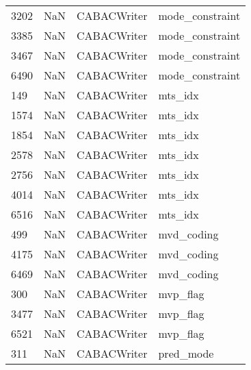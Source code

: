 \begin{tabular}{llll}
3202 &                   NaN &                CABACWriter &                           mode\_constraint \\
3385 &                   NaN &                CABACWriter &                           mode\_constraint \\
3467 &                   NaN &                CABACWriter &                           mode\_constraint \\
6490 &                   NaN &                CABACWriter &                           mode\_constraint \\
149  &                   NaN &                CABACWriter &                                   mts\_idx \\
1574 &                   NaN &                CABACWriter &                                   mts\_idx \\
1854 &                   NaN &                CABACWriter &                                   mts\_idx \\
2578 &                   NaN &                CABACWriter &                                   mts\_idx \\
2756 &                   NaN &                CABACWriter &                                   mts\_idx \\
4014 &                   NaN &                CABACWriter &                                   mts\_idx \\
6516 &                   NaN &                CABACWriter &                                   mts\_idx \\
499  &                   NaN &                CABACWriter &                                mvd\_coding \\
4175 &                   NaN &                CABACWriter &                                mvd\_coding \\
6469 &                   NaN &                CABACWriter &                                mvd\_coding \\
300  &                   NaN &                CABACWriter &                                  mvp\_flag \\
3477 &                   NaN &                CABACWriter &                                  mvp\_flag \\
6521 &                   NaN &                CABACWriter &                                  mvp\_flag \\
311  &                   NaN &                CABACWriter &                                 pred\_mode \\

\end{tabular}
